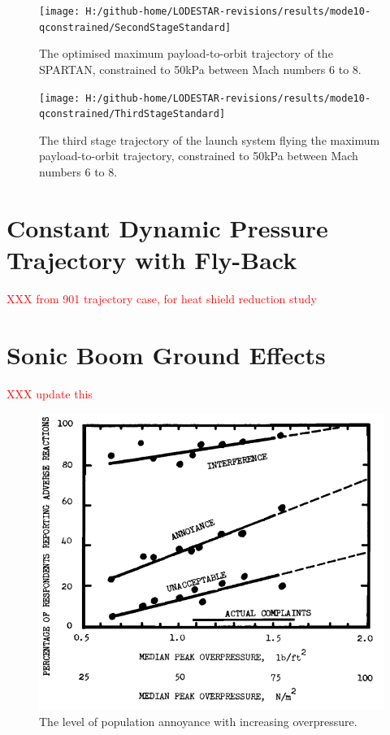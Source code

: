 \begin{figure}[th]
\centering
\texttt{[image: H:/github-home/LODESTAR-revisions/results/mode10-qconstrained/SecondStageStandard]}
\caption{The optimised maximum payload-to-orbit trajectory of the SPARTAN, constrained to 50kPa between Mach numbers 6 to 8.}
\label{fig:SecondStageqConstrained68}
\end{figure}

\begin{figure}[th]
\centering
\texttt{[image: H:/github-home/LODESTAR-revisions/results/mode10-qconstrained/ThirdStageStandard]}
\caption{The third stage trajectory of the launch system flying the maximum payload-to-orbit trajectory, constrained to 50kPa between Mach numbers 6 to 8.}
\label{fig:ThirdStageqConstrained68}
\end{figure}






\section{Constant Dynamic Pressure Trajectory with Fly-Back}
\textcolor{red}{XXX from 901 trajectory case, for heat shield reduction study}


\section{Sonic Boom Ground Effects}
\textcolor{red}{XXX update this}


\begin{figure}[ht]
	\centering
	\includegraphics[width=0.6\linewidth]{figures/6_FlyBack/OverPressureResponse}
	\caption{The level of population annoyance with increasing overpressure.}
	\label{fig:OverPressureResponse}
\end{figure}

